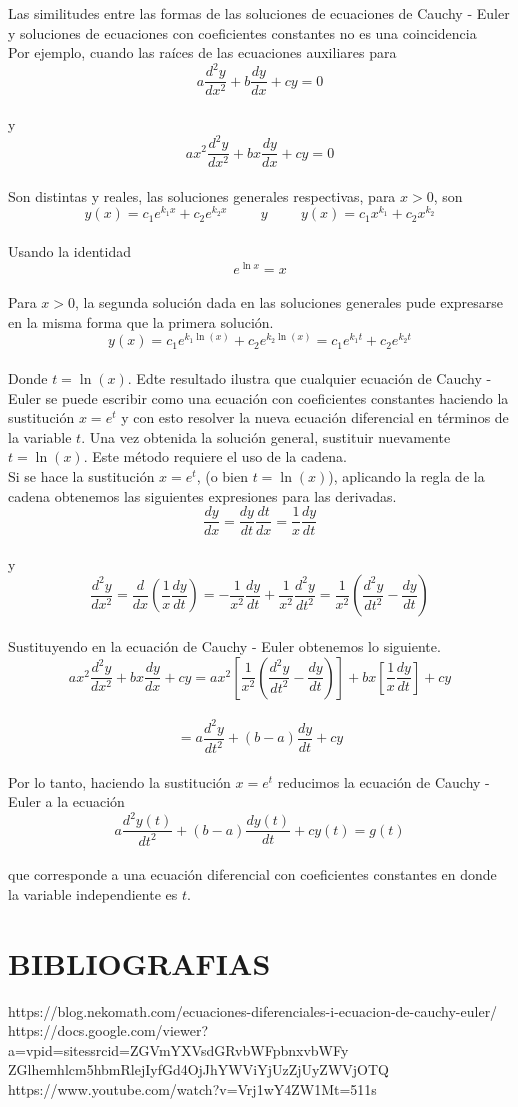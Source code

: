 \documentclass[12pt,letterpaper]{article}
\begin{document}
Las similitudes entre las formas de las soluciones de ecuaciones de Cauchy - Euler y soluciones de ecuaciones con coeficientes constantes no es una coincidencia\\
Por ejemplo, cuando las raíces de las ecuaciones auxiliares para\\
$$a\frac{d^{2}y}{dx^{2}}+b\frac{dy}{dx}+cy=0$$\\
y\\
$$ax^{2}\frac{d^{2}y}{dx^{2}}+bx\frac{dy}{dx}+cy=0$$\\
Son distintas y reales, las soluciones generales respectivas, para $x>0$, son\\
$$y(x)=c_{1}e^{k_{1}x}+c_{2}e^{k_{2}x}\hspace{1cm}y\hspace{1cm}y(x)=c_{1}x^{k_{1}}+c_{2}x^{k_{2}}$$\\
Usando la identidad $$e^{\ln x}=x$$\\
Para $x>0$, la segunda solución dada en las soluciones generales pude expresarse en la misma forma que la primera solución.\\
$$y(x)=c_{1}e^{k_{1}\ln(x)}+c_{2}e^{k_{2}\ln(x)}=c_{1}e^{k_{1}t}+c_{2}e^{k_{2}t}$$\\
Donde $t=\ln(x)$. Edte resultado ilustra que cualquier ecuación de Cauchy - Euler se puede escribir como una ecuación con coeficientes constantes haciendo la sustitución $x=e^{t}$ y con esto resolver la nueva ecuación diferencial en términos de la variable $t$. Una vez obtenida la solución general, sustituir nuevamente $t=\ln(x)$. Este método requiere el uso de la cadena.\\
Si se hace la sustitución $x=e^{t}$, (o bien $t=\ln(x)$), aplicando la regla de la cadena obtenemos las siguientes expresiones para las derivadas.\\
$$\frac{dy}{dx}=\frac{dy}{dt}\frac{dt}{dx}=\frac{1}{x}\frac{dy}{dt}$$\\
y\\
$$\frac{d^{2}y}{dx^{2}}=\frac{d}{dx}\left(\frac{1}{x}\frac{dy}{dt}\right)=-\frac{1}{x^{2}}\frac{dy}{dt}+\frac{1}{x^{2}}\frac{d^{2}y}{dt^{2}}=\frac{1}{x^{2}}\left(\frac{d^{2}y}{dt^{2}}-\frac{dy}{dt}\right)$$\\
Sustituyendo en la ecuación de Cauchy - Euler obtenemos lo siguiente.\\
$$ax^{2}\frac{d^{2}y}{dx^{2}}+bx\frac{dy}{dx}+cy=ax^{2}\left[\frac{1}{x^{2}}\left(\frac{d^{2}y}{dt^{2}}-\frac{dy}{dt}\right)\right]+bx\left[\frac{1}{x}\frac{dy}{dt}\right]+cy$$\\
$$=a\frac{d^{2}y}{dt^{2}}+(b-a)\frac{dy}{dt}+cy$$\\
Por lo tanto, haciendo la sustitución $x=e^{t}$ reducimos la ecuación de Cauchy - Euler a la ecuación\\
$$a\frac{d^{2}y(t)}{dt^{2}}+(b-a)\frac{dy(t)}{dt}+cy(t)=g(t)$$\\
que corresponde a una ecuación diferencial con coeficientes constantes en donde la variable independiente es $t$.
\pagebreak
\section{\large BIBLIOGRAFIAS}
 https://blog.nekomath.com/ecuaciones-diferenciales-i-ecuacion-de-cauchy-euler/\\
 https://docs.google.com/viewer?a=vpid=sitessrcid=ZGVmYXVsdGRvbWFpbnxvbWFy\\
 ZGlhemhlcm5hbmRlejIyfGd4OjJhYWViYjUzZjUyZWVjOTQ\\
 https://www.youtube.com/watch?v=Vrj1wY4ZW1Mt=511s
\end{document}
